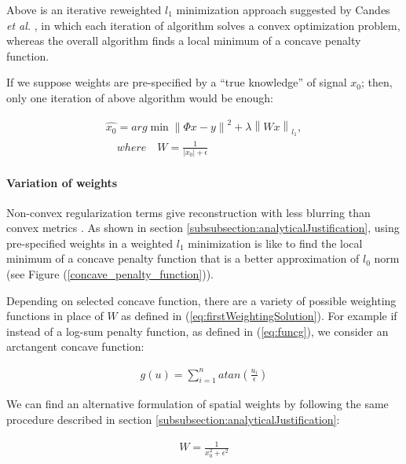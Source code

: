 Above is an iterative reweighted $l_{1}$ minimization approach suggested by Candes \emph{et al.} \cite{candes2008enhancing}, in which each iteration of algorithm solves a convex optimization problem, whereas the overall algorithm finds a local minimum of a concave penalty function.

If we suppose weights are pre-specified by a ``true knowledge'' of signal $x_{0}$; then, only one iteration of above algorithm would be enough:

\begin{equation}
\label{eq:firstWeightingSolution}
\begin{gathered}
\hat{x_{0}} = arg \min \left \| \Phi x-y \right \|^{2} + \lambda \left \| Wx \right \|_{l_{1}}, \\
\quad where \quad W = \frac{1}{\left | x_{0} \right |+\epsilon }
\end{gathered}
\end{equation}

\paragraph{Variation of weights} %

Non-convex regularization terms give reconstruction with less blurring than convex metrics \cite{yang2013}. As shown in section \ref{subsubsection:analyticalJustification}, using pre-specified weights in a weighted $l_1$ minimization is like to find the local minimum of a concave penalty function that is a better approximation of $l_0$ norm (see Figure (\ref{concave_penalty_function})).

Depending on selected concave function, there are a variety of possible weighting functions in place of $W$ as defined in (\ref{eq:firstWeightingSolution}). For example if instead of a log-sum penalty function, as defined in (\ref{eq:funcg}), we consider an arctangent concave function:

\begin{equation}
\label{eq:atan}
\begin{gathered}
g\left ( u \right ) =
\sum_{i=1}^{n} atan(\frac{u_{i}}{\epsilon })
\end{gathered}
\end{equation}

We can find an alternative formulation of spatial weights by following the same procedure described in section \ref{subsubsection:analyticalJustification}:

\begin{equation}
\label{eq:newWeights}
\begin{gathered}
W = \frac{1}{ x_{0}^{2}+\epsilon^{2} }
\end{gathered}
\end{equation}


